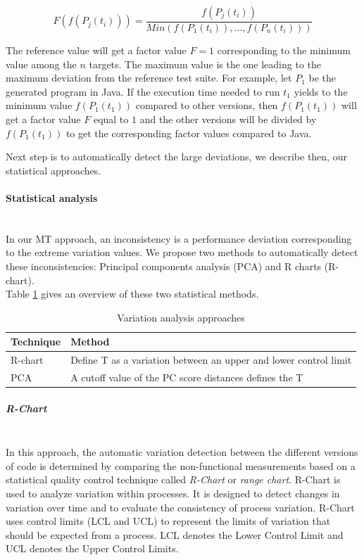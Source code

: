 \begin{equation}
F(f(P_{j}(t_{i})))=\frac{f(P_{j}(t_{i}))}{Min(f(P_{1}(t_{i})),..., f(P_{n}(t_{i})))}  
\end{equation}

The reference value will get a factor value $F = 1$ corresponding to the minimum value among the $n$ targets. The maximum value is the one leading to the maximum deviation from the reference test suite. For example, let $P_{1}$ be the generated program in Java. If the execution time needed to run $t_{1}$ yields to the minimum value $f(P_{1}(t_{1}))$ compared to other versions, then $f(P_{1}(t_{1}))$ will get a factor value $F$ equal to $1$ and the other versions will be divided by $f(P_{1}(t_{1}))$ to get the corresponding factor values compared to Java.

Next step is to automatically detect the large deviations, we describe then, our statistical approaches.

\paragraph{Statistical analysis}~\\
 
In our MT approach, an inconsistency is a performance deviation corresponding to the extreme variation values.
We propose two methods to automatically detect these inconsistencies: Principal components analysis (PCA) and R charts (R-chart).\\
Table \ref{tab:Statistical methods} gives an overview of these two statistical methods.
\begin{table}[h]
	\centering
	
	\begin{tabular}{| l |l |}				
		\hline
		
		\textbf{Technique} &  \textbf{Method}    \\ \hline
	    R-chart &  Define T as a variation between an upper and lower control limit  \\ \hline
		PCA &  A cutoff value of the PC score distances defines the T \\ \hline
	\end{tabular}
	
	\caption{Variation analysis approaches}
	\label{tab:Statistical methods}
\end{table}

\subparagraph{R-Chart}~\\
In this approach, the automatic variation detection between the different versions of code is determined by comparing the non-functional measurements based on a statistical quality control technique called \textit{R-Chart} or \textit{range chart}\cite{malik2013automatic}. 
R-Chart is used to analyze variation within processes. It is designed to detect changes in variation over time and to evaluate the consistency of process variation.
R-Chart uses control limits (LCL and UCL) to represent the limits of variation that should be expected from a process. LCL denotes the Lower Control Limit and UCL denotes the Upper Control Limits.
 
